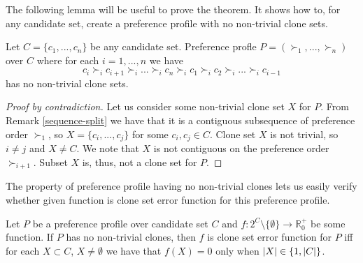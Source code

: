 The following lemma will be useful to prove the theorem.
It shows how to, for any candidate set, create a preference profile with no non-trivial clone sets.

\begin{lmm} \label{lmmnotrivial}
        Let $C = \{c_1, ..., c_n\}$ be any candidate set.
	Preference profle $P = (\succ_1, ... , \succ_n)$ over $C$
	where for each $i=1,...,n$ we have
	$$c_i \succ_i c_{i+1} \succ_i ... \succ_i c_n \succ_i c_1 \succ_i c_2 \succ_i ... \succ_i c_{i-1}$$
	has no non-trivial clone sets.
\end{lmm}

\begin{proof}[Proof by contradiction]
Let us consider some non-trivial clone set $X$ for $P$.
From Remark \ref{sequence-split} we have that it is a contiguous subsequence of preference order $\succ_1$,
so $X = \{c_i, ..., c_j\}$ for some $c_i, c_j \in C$.
Clone set $X$ is not trivial, so $i\neq{j}$ and $X\neq{C}$.
We note that $X$ is not contiguous on the preference order $\succ_{i+1}$.
Subset $X$ is, thus, not a clone set for $P$.
\end{proof}

The property of preference profile having no non-trivial clones lets us easily
verify whether given function is clone set error function for this preference profile.

\begin{rmrk}
Let $P$ be a preference profile over candidate set $C$
and $f : 2^C\setminus\{\emptyset\} \rightarrow \mathbb{R}_0^+$ be some function.
If $P$ has no non-trivial clones, then $f$ is clone set error function for $P$
iff for each $X \subset C$, $X \neq \emptyset$ we have that $f(X) = 0$ only when $\left\vert X \right\vert \in \{1, \left\vert C \right\vert\}$.
\end{rmrk}


